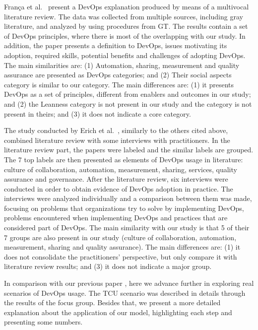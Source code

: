 Fran\c{c}a et al.~\cite{characterizing_devops_sbes_2016} present a DevOps
explanation produced by means of a multivocal literature review. The data was collected
from multiple sources, including gray literature, and analyzed by using procedures
from GT. The results contain a set of DevOps principles, where
there is most of the overlapping with our study. In addition, the paper
presents a definition to DevOps, issues motivating its adoption, required skills,
potential benefits and challenges of adopting DevOps. The main similarities
are: (1) Automation, sharing, measurement and quality assurance are presented as
DevOps categories; and (2) Their social aspects category is similar to our
\cc category. The main differences are: (1) it presents DevOps as a
set of principles, different from enablers and outcomes in our study; and (2) the Leanness
category is not present in our study and the  category is not present
in theirs; and (3) it does not indicate a core category.

The study conducted by Erich et al.~\cite{qualitative_devops_journalsw_17},
similarly to the others cited above, combined literature review with some
interviews with practitioners. In the literature review part, the papers were
labeled and the similar labels are grouped. The 7 top labels are then presented
as elements of DevOps usage in literature: culture of collaboration, automation,
measurement, sharing, services, quality assurance and governance. After the literature
review, six interviews were conducted in order to obtain evidence of DevOps
adoption in practice. The interviews were analyzed individually and a comparison
between them was made, focusing on problems that organizations try to solve by
implementing DevOps, problems encountered when implementing DevOps and practices
that are considered part of DevOps. The main similarity with our study
is that 5 of their 7 groups are also present in our study (culture of collaboration,
automation, measurement, sharing and quality assurance). The main
differences are: (1) it does not consolidate the practitioners' perspective, but
only compare it with literature review results; and (3) it does not indicate a major group.

In comparison with our previous paper \cite{Luz:2018:ESEM}, here we advance
further in exploring real scenarios of DevOps usage. The TCU scenario was
described in details through the results of the focus group. Besides that, we
present a more detailed explanation about the application of our model,
highlighting each step and presenting some numbers.

